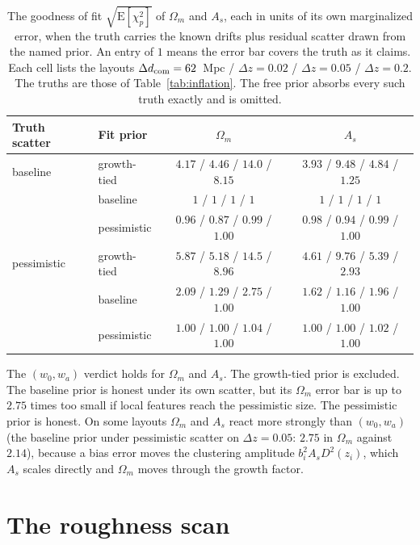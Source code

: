 \documentclass[11pt]{article}
\begin{document}
\begin{table}[ht]
  \centering
  \small
  \begin{tabular}{llcc}
    \hline
    Truth scatter & Fit prior & $\Omega_m$ & $A_s$ \\
    \hline
    baseline & growth-tied &
    $4.17$ / $4.46$ / $14.0$ / $8.15$ &
    $3.93$ / $9.48$ / $4.84$ / $1.25$ \\
    & baseline &
    $1$ / $1$ / $1$ / $1$ & $1$ / $1$ / $1$ / $1$ \\
    & pessimistic &
    $0.96$ / $0.87$ / $0.99$ / $1.00$ &
    $0.98$ / $0.94$ / $0.99$ / $1.00$ \\
    \hline
    pessimistic & growth-tied &
    $5.87$ / $5.18$ / $14.5$ / $8.96$ &
    $4.61$ / $9.76$ / $5.39$ / $2.93$ \\
    & baseline &
    $2.09$ / $1.29$ / $2.75$ / $1.00$ &
    $1.62$ / $1.16$ / $1.96$ / $1.00$ \\
    & pessimistic &
    $1.00$ / $1.00$ / $1.04$ / $1.00$ &
    $1.00$ / $1.00$ / $1.02$ / $1.00$ \\
    \hline
  \end{tabular}
  \caption{The goodness of fit $\sqrt{\mathrm{E}[\chi^2_p]}$ of
    $\Omega_m$ and $A_s$, each in units of its own marginalized
    error, when the truth carries the known drifts plus residual
    scatter drawn from the named prior.  An entry of $1$ means the
    error bar covers the truth as it claims.  Each cell lists the
    layouts $\Delta d_{\rm com} = 62$~Mpc / $\Delta z = 0.02$ /
    $\Delta z = 0.05$ / $\Delta z = 0.2$.  The truths are those of
    Table~\ref{tab:inflation}.  The free prior absorbs every
    such truth exactly and is omitted.}
  \label{tab:inflationomas}
\end{table}

The $(w_0, w_a)$ verdict holds for $\Omega_m$ and $A_s$.  The growth-tied prior
is excluded.  The baseline prior is honest under its own scatter, but its
$\Omega_m$ error bar is up to $2.75$ times too small if local
features reach the pessimistic size.  The pessimistic prior is honest.
On some layouts $\Omega_m$ and $A_s$ react more strongly than
$(w_0, w_a)$ (the baseline prior under pessimistic scatter on
$\Delta z = 0.05$: $2.75$ in $\Omega_m$ against $2.14$), because a bias
error moves the clustering amplitude $b_i^2 A_s D^2(z_i)$, which $A_s$
scales directly and $\Omega_m$ moves through the growth factor.

\section{The roughness scan}
\label{app:roughness}
\end{document}
